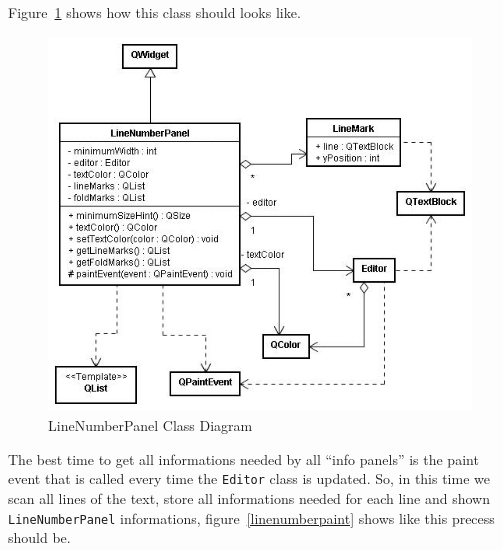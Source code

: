 \documentclass[11pt,a4paper]{report}
\begin{document}
Figure~\ref{linenumberpanel} shows how this class should looks like.

\begin{figure}[hbt]
\centering
\includegraphics{images/linenumberpanel.jpg}
\caption{LineNumberPanel Class Diagram} \label{linenumberpanel}
\end{figure}

The best time to get all informations needed by all ``info panels'' is the paint event that is called every time the \texttt{Editor} class is updated. So, in this time we scan all lines of the text, store all informations needed for each line and shown \texttt{LineNumberPanel} informations, figure~\ref{linenumberpaint} shows like this precess should be.
\end{document}
